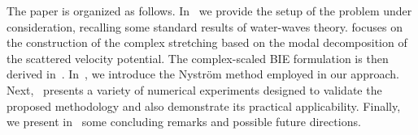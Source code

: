 \documentclass[review,hidelinks,onefignum,onetabnum]{siamart220329}
\begin{document}
The paper is organized as follows. In~ we provide the setup of the problem under consideration, recalling some standard results of water-waves theory.  focuses on the construction of the complex stretching based on the modal decomposition of the scattered velocity potential. The complex-scaled BIE formulation is then derived in~. In~, we introduce the Nystr\"om method employed in our approach. Next,~ presents a variety of numerical experiments designed to validate the proposed methodology and also demonstrate its practical applicability. Finally, we present in~ some concluding remarks and possible future directions. 




\end{document}

